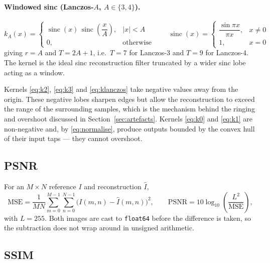 \documentclass[11pt,a4paper]{article}
\begin{document}
\paragraph{Windowed sinc (Lanczos-$A$, $A \in \{3,4\}$).}
\begin{equation}
k_{A}(x) = \begin{cases}
\operatorname{sinc}(x)\,\operatorname{sinc}\!\left(\dfrac{x}{A}\right), & |x| < A \\[8pt]
0, & \text{otherwise}
\end{cases}
\qquad
\operatorname{sinc}(x) = \begin{cases} \dfrac{\sin \pi x}{\pi x}, & x \neq 0 \\[6pt]
1, & x = 0 \end{cases}
\label{eq:klanczos}
\end{equation}
giving $r = A$ and $T = 2A+1$, i.e.\ $T = 7$ for Lanczos-3 and $T = 9$ for Lanczos-4. The
kernel is the ideal sinc reconstruction filter truncated by a wider sinc lobe acting as a
window.

Kernels \eqref{eq:k2}, \eqref{eq:k3} and \eqref{eq:klanczos} take negative values away from
the origin. These negative lobes sharpen edges but allow the reconstruction to exceed the
range of the surrounding samples, which is the mechanism behind the ringing and overshoot
discussed in Section~\ref{sec:artefacts}. Kernels \eqref{eq:k0} and \eqref{eq:k1} are
non-negative and, by \eqref{eq:normalise}, produce outputs bounded by the convex hull of their
input taps --- they cannot overshoot.

\subsection{PSNR}

For an $M \times N$ reference $I$ and reconstruction $\hat{I}$,
\begin{equation}
\mathrm{MSE} = \frac{1}{MN}\sum_{m=0}^{M-1}\sum_{n=0}^{N-1}
\big(I(m,n) - \hat{I}(m,n)\big)^{2},
\qquad
\mathrm{PSNR} = 10 \log_{10}\!\left(\frac{L^{2}}{\mathrm{MSE}}\right),
\label{eq:psnr}
\end{equation}
with $L = 255$. Both images are cast to \texttt{float64} before the difference is taken, so
the subtraction does not wrap around in unsigned arithmetic.

\subsection{SSIM}
\end{document}
